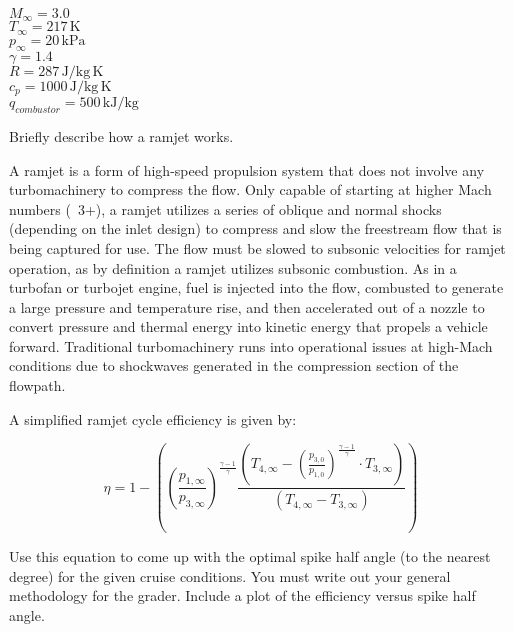 \documentclass[../main.tex]{subfiles}
\begin{document}

\givens{}
\(M_\infty = 3.0\)\\
\(T_\infty = 217 \,\unit{\kelvin}\)\\
\(p_\infty = 20 \,\unit{\kilo\pascal}\)\\
\(\gamma=1.4\)\\
\(R = 287\,\unit{\joule/\kilogram\,\kelvin}\)\\
\(c_p = 1000 \, \unit{\joule/\kilogram\,\kelvin}\)\\
\(q_{combustor} = 500 \, \unit{\kilo\joule/\kilogram}\)

\assumptions{}



Briefly describe how a ramjet works.

\discussion{}
A ramjet is a form of high-speed propulsion system that does not involve any turbomachinery to compress the flow.
Only capable of starting at higher Mach numbers (~3+), a ramjet utilizes a series of oblique and normal shocks (depending on the inlet design) to compress and slow the freestream flow that is being captured for use.
The flow must be slowed to subsonic velocities for ramjet operation, as by definition a ramjet utilizes subsonic combustion.
As in a turbofan or turbojet engine, fuel is injected into the flow, combusted to generate a large pressure and temperature rise, and then accelerated out of a nozzle to convert pressure and thermal energy into kinetic energy that propels a vehicle forward.
Traditional turbomachinery runs into operational issues at high-Mach conditions due to shockwaves generated in the compression section of the flowpath.


A simplified ramjet cycle efficiency is given by:

\[
    \eta = 1 - \left({
    \left({\frac{p_{1,\infty}}{p_{3,\infty}}}\right)^{\frac{\gamma-1}{\gamma}}
    \frac{
        \left({T_{4,\infty} - \left({\frac{p_{3,0}}{p_{1,0}}}\right)^{{\frac{\gamma-1}{\gamma}}}} \cdot T_{3,\infty}\right)
    }{\left({T_{4,\infty}-T_{3,\infty}}\right)}
    }\right)
\]

Use this equation to come up with the optimal spike half angle (to the nearest degree) for the given cruise conditions. 
You must write out your general methodology for the grader.
Include a plot of the efficiency versus spike half angle.

\givens{}

\assumptions{}
\end{document}
